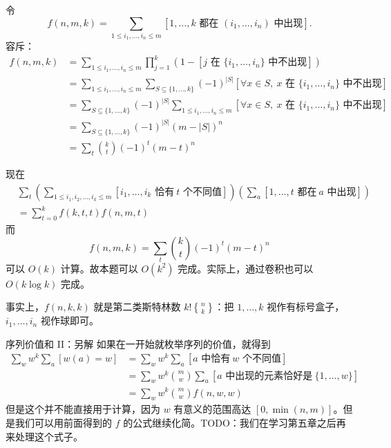 \begin{frame}
    令 
    $$
    f(n,m,k)=\sum_{1\le i_1,\ldots,i_n\le m}[1,\ldots,k\text{ 都在 }(i_1,\ldots,i_n)\text{ 中出现}].
    $$
    容斥：
    $$
    \begin{aligned}
    f(n,m,k)&=\sum_{1\le i_1,\ldots,i_n\le m}\prod_{j=1}^k(1-[j\text{ 在 }\{i_1,\ldots,i_n\}\text{ 中不出现}])\\
    &=\sum_{1\le i_1,\ldots,i_n\le m}\sum_{S\subseteq \{1,\ldots,k\}}(-1)^{|S|}[\forall x\in S,\ x\text{ 在 }\{i_1,\ldots,i_n\}\text{ 中不出现}]\\
    &=\sum_{S\subseteq \{1,\ldots,k\}}(-1)^{|S|}\sum_{1\le i_1,\ldots,i_n\le m}[\forall x\in S,\ x\text{ 在 }\{i_1,\ldots,i_n\}\text{ 中不出现}]\\
    &=\sum_{S\subseteq \{1,\ldots,k\}}(-1)^{|S|}(m-|S|)^n\\
    &=\sum_t\binom{k}{t}(-1)^{t}(m-t)^n
    \end{aligned}
    $$
\end{frame}
\begin{frame}
    现在
    $$
    \begin{aligned}
        &\sum_t\left(\sum_{1\le i_1,i_2,\ldots,i_k\le m}[i_1,\ldots,i_k\text{ 恰有}\ t\text{ 个不同值}]\right)\left(\sum_a[1,\ldots,t\text{ 都在}\ a\text{ 中出现}]\right)\\
        &=\sum_{t=0}^k f(k,t,t)f(n,m,t)
    \end{aligned}
    $$
    而
    $$
    f(n,m,k)=\sum_t\binom{k}{t}(-1)^t(m-t)^n
    $$
    可以 $O(k)$ 计算。故本题可以 $O(k^2)$ 完成。实际上，通过卷积也可以 $O(k\log k)$ 完成。
    
    事实上，$f(n,k,k)$ 就是第二类斯特林数 $k! {n \brace k}$：把 $1,\ldots,k$ 视作有标号盒子，$i_1,\ldots,i_n$ 视作球即可。
\end{frame}
\begin{frame}{序列价值和 II：另解}
    如果在一开始就枚举序列的价值，就得到
    $$
    \begin{aligned}
    \sum_w w^k\sum_a [w(a)=w]&=\sum_w w^k\sum_a [a\text{ 中恰有}\ w\text{ 个不同值}]\\
    &=\sum_w w^k\binom{m}{w}\sum_a[a\text{ 中出现的元素恰好是}\ \{1,\ldots,w\}]\\
    &=\sum_w w^k\binom{m}{w}f(n,w,w)
    \end{aligned}
    $$
    但是这个并不能直接用于计算，因为 $w$ 有意义的范围高达 $[0,\min(n,m)]$。但是我们可以用前面得到的 $f$ 的公式继续化简。TODO：我们在学习第五章之后再来处理这个式子。
\end{frame}

